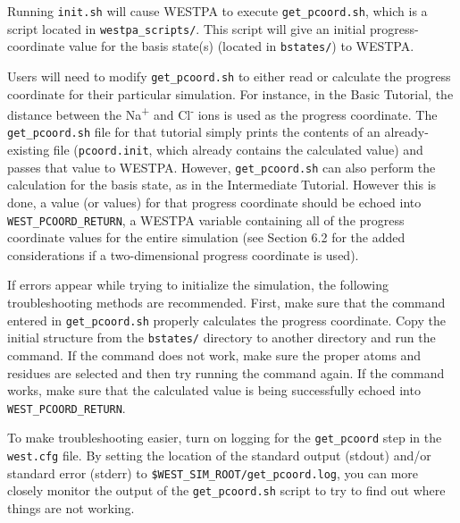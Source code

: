 \documentclass[9pt,tutorial,ASAPversion]{livecoms}
\begin{document}
Running \verb|init.sh| will cause WESTPA to execute \verb|get_pcoord.sh|, which is a script located in \verb|westpa_scripts/|. 
This script will give an initial progress-coordinate value for the basis state(s) (located in \verb|bstates/|) to WESTPA.


Users will need to modify \verb|get_pcoord.sh| to either read or calculate the progress coordinate for their particular simulation.
For instance, in the Basic Tutorial, the distance between the Na\textsuperscript{+} and Cl\textsuperscript{-} ions is used as the progress coordinate.
The \verb|get_pcoord.sh| file for that tutorial simply prints the contents of an already-existing file (\verb|pcoord.init|, which already contains the calculated value) and passes that value to WESTPA. 
However, \verb|get_pcoord.sh| can also perform the calculation for the basis state, as in the Intermediate Tutorial.
However this is done, a value (or values) for that progress coordinate should be echoed into \verb|WEST_PCOORD_RETURN|, a WESTPA variable containing all of the progress coordinate values for the entire simulation (see Section 6.2 for the added considerations if a two-dimensional progress coordinate is used).

If errors appear while trying to initialize the simulation, the following troubleshooting methods are recommended. 
First, make sure that the command entered in \verb|get_pcoord.sh| properly calculates the progress coordinate. 
Copy the initial structure from the \verb|bstates/| directory to another directory and run the command. 
If the command does not work, make sure the proper atoms and residues are selected and then try running the command again. 
If the command works, make sure that the calculated value is being successfully echoed into \verb|WEST_PCOORD_RETURN|.

To make troubleshooting easier, turn on logging for the \verb|get_pcoord| step in the \verb|west.cfg| file. 
By setting the location of the standard output (stdout) and/or standard error (stderr) to \verb|$WEST_SIM_ROOT/get_pcoord.log|, you can more closely monitor the output of the \verb|get_pcoord.sh| script to try to find out where things are not working.
\end{document}
